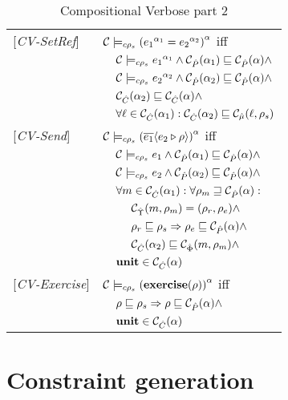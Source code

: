 \begin{table}[tlb]
\begin{tabular} {l l l l}
{[\textit{CV-SetRef}]}&\multicolumn{3}{l}{${\cal C} \models_{c \rho_s} {({e_1}^{\alpha_1} = {e_2}^{\alpha_2})}^{\alpha} $ iff}\\
&&\multicolumn{2}{l}{$ {\cal C} \models_{c \rho_s} {e_1}^{\alpha_1} \wedge {\cal C}_{\hat{P}}(\alpha_1) \sqsubseteq {\cal C}_{\hat{P}}(\alpha) \wedge $}\\
&&\multicolumn{2}{l}{$ {\cal C} \models_{c \rho_s} {e_2}^{\alpha_2} \wedge {\cal C}_{\hat{P}}(\alpha_2) \sqsubseteq {\cal C}_{\hat{P}}(\alpha) \wedge $}\\
&&\multicolumn{2}{l}{${\cal C}_{\hat{C}}(\alpha_2) \sqsubseteq {\cal C}_{\hat{C}}(\alpha) \wedge$} \\
&&\multicolumn{2}{l}{$ \forall \ell \in {\cal C}_{\hat{C}}(\alpha_1) : {\cal C}_{\hat{C}}(\alpha_2) \sqsubseteq {\cal C}_{\hat{\mu}}(\ell, \rho_s)$} \\
{[\textit{CV-Send}]}&\multicolumn{3}{l}{${\cal C} \models_{c \rho_s} {(\overline{e_1} \langle e_2 \triangleright \rho \rangle)}^{\alpha} $ iff}\\
&&\multicolumn{2}{l}{$ {\cal C} \models_{c \rho_s} e_1 \wedge {\cal C}_{\hat{P}}(\alpha_1) \sqsubseteq {\cal C}_{\hat{P}}(\alpha) \wedge$}\\
&&\multicolumn{2}{l}{$ {\cal C} \models_{c \rho_s} e_2 \wedge {\cal C}_{\hat{P}}(\alpha_2) \sqsubseteq {\cal C}_{\hat{P}}(\alpha) \wedge$}\\
&&\multicolumn{2}{l}{$ \forall m \in {\cal C}_{\hat{C}}(\alpha_1) : \forall \rho_m \sqsupseteq {\cal C}_{\hat{P}}(\alpha):$}\\
&&&${\cal C}_{\hat{\Upsilon}}(m, \rho_m) = (\rho_r, \rho_e)\wedge $\\
&&&$\rho_r \sqsubseteq \rho_s \Rightarrow \rho_e \sqsubseteq {\cal C}_{\hat{P}}(\alpha) \wedge$\\
&&&${\cal C}_{\hat{C}}(\alpha_2) \sqsubseteq {\cal C}_{\hat{\Phi}}(m, \rho_m) \wedge $\\
&&\multicolumn{2}{l}{$\mathbf{unit} \in {\cal C}_{\hat{C}}(\alpha) $}\\
{[\textit{CV-Exercise}]}&\multicolumn{3}{l}{${\cal C} \models_{c \rho_s} {(\mathbf{exercise}(\rho))}^{\alpha} $ iff}\\
&&\multicolumn{2}{l}{$ \rho \sqsubseteq \rho_s \Rightarrow \rho \sqsubseteq {\cal C}_{\hat{P}}(\alpha) \wedge $}\\
&&\multicolumn{2}{l}{$ \mathbf{unit} \in {\cal C}_{\hat{C}}(\alpha)$}\\
\end{tabular}
\caption{Compositional Verbose part 2}
\label{tab:CompVerb2}
\end{table}



\section{Constraint generation}
\label{sec:ConstraintGen}
\newcommand{\genl}[1]{\mathcal{C}_{*\rho_s}\llbracket (#1)^\all \rrbracket}
\newcommand{\gen}[1]{\mathcal{C}_{*\rho_s}\llbracket (#1) \rrbracket}
\newcommand{\Cel}{\mathsf{C}}
\newcommand{\Rel}{\mathsf{\Gamma}}
\newcommand{\Pel}{\mathsf{P}}
\newcommand{\Mel}{\mathsf{M}}
\newcommand{\El}{\mathsf{E}}
\newcommand{\Upsel}{\mathsf{\Upsilon}}
\newcommand{\Phiel}{\mathsf{\Phi}}
\newcommand{\braces}[1]{\{ #1 \} }
\newcommand{\parens}[1]{\( #1 \) }

